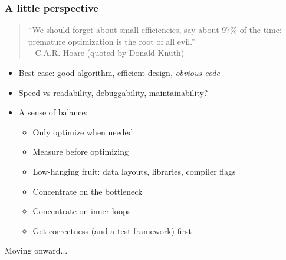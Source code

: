 \documentclass{beamer}
\begin{document}
\begin{frame}
  \frametitle{A little perspective}

  \begin{quote}
    ``We should forget about small efficiencies, say about 97\% of the time:
    premature optimization is the root of all evil.'' \\
    \hfill -- C.A.R. Hoare (quoted by Donald Knuth)
  \end{quote}

  \begin{itemize}
  \item Best case: good algorithm, efficient design, {\em obvious code}
  \item Speed vs readability, debuggability, maintainability?
  \item A sense of balance:
    \begin{itemize}
    \item Only optimize when needed
    \item Measure before optimizing
    \item Low-hanging fruit: data layouts, libraries, compiler flags
    \item Concentrate on the bottleneck
    \item Concentrate on inner loops
    \item Get correctness (and a test framework) first
    \end{itemize}
  \end{itemize}
\end{frame}


\begin{frame}
  \begin{center}
    Moving onward...
  \end{center}
\end{frame}
\end{document}
